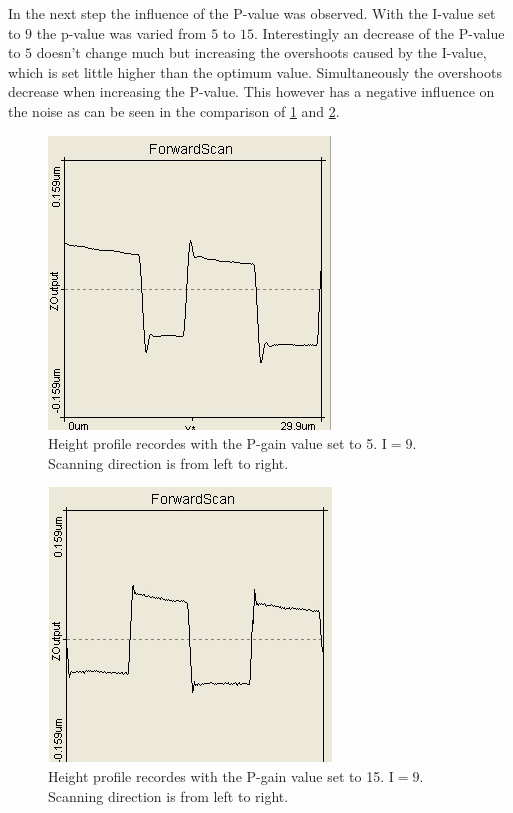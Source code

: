 \documentclass[paper=a4,fontsize=10pt,DIV=18,twocolumn,parskip=half]{scrartcl}
\numberwithin{equation}{section}    %
\begin{document}
In the next step the influence of the P-value was observed. With the I-value set to $9$ the p-value was varied from $5$ to $15$. Interestingly an decrease of the P-value to $5$ doesn't change much but increasing the overshoots caused by the I-value, which is set little higher than the optimum value. Simultaneously the overshoots decrease when increasing the P-value. This however has a negative influence on the noise as can be seen in the comparison of \ref{wenigP} and \ref{vielP}.

\begin{figure}[htp]
	\begin{center}
		\includegraphics[width=0.6\columnwidth]{Bilder/wenigP}
		\caption{Height profile recordes with the P-gain value set to 5. $\mathrm{I}=9$. Scanning direction is from left to right.}
		\label{wenigP}
	\end{center}
\end{figure}

\begin{figure}[htp]
	\begin{center}
		\includegraphics[width=0.6\columnwidth]{Bilder/vielP}
		\caption{Height profile recordes with the P-gain value set to 15. $\mathrm{I}=9$. Scanning direction is from left to right.}
		\label{vielP}
	\end{center}
\end{figure}
\end{document}
